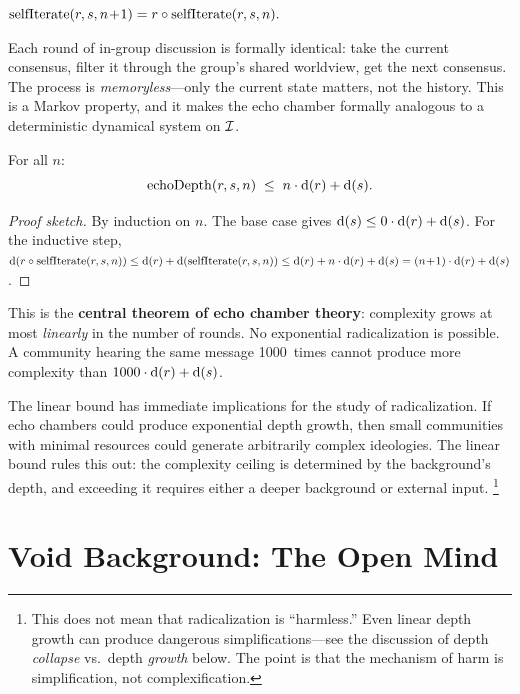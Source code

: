 \begin{theorem}
\label{thm:echo-step}
$\mathrm{selfIterate}(r, s, n\!+\!1) = r\circ\mathrm{selfIterate}(r,s,n).$
\end{theorem}

Each round of in-group discussion is formally identical: take the current
consensus, filter it through the group's shared worldview, get the next
consensus.  The process is \emph{memoryless}---only the current state
matters, not the history.  This is a Markov property, and it makes the echo
chamber formally analogous to a deterministic dynamical system on $\mathcal{I}$.

\begin{theorem}
\label{thm:echo-depth-bound}
For all $n$:
\[
  \mathrm{echoDepth}(r,s,n) \;\le\; n\cdot\operatorname{d}(r) + \operatorname{d}(s).
\]
\end{theorem}

\begin{proof}[Proof sketch]
By induction on $n$.  The base case gives $\operatorname{d}(s)\le 0\cdot\operatorname{d}(r)+\operatorname{d}(s)$.
For the inductive step, $\operatorname{d}(r\circ\mathrm{selfIterate}(r,s,n))
\le\operatorname{d}(r)+\operatorname{d}(\mathrm{selfIterate}(r,s,n))
\le\operatorname{d}(r)+n\cdot\operatorname{d}(r)+\operatorname{d}(s)
= (n\!+\!1)\cdot\operatorname{d}(r)+\operatorname{d}(s)$.
\end{proof}

This is the \textbf{central theorem of echo chamber theory}: complexity
grows at most \emph{linearly} in the number of rounds.  No exponential
radicalization is possible.  A community hearing the same message 1000~times
cannot produce more complexity than $1000\cdot\operatorname{d}(r)+\operatorname{d}(s)$.

The linear bound has immediate implications for the study of radicalization.
If echo chambers could produce exponential depth growth, then small
communities with minimal resources could generate arbitrarily complex
ideologies.  The linear bound rules this out: the complexity ceiling is
determined by the background's depth, and exceeding it requires either a
deeper background or external input.%
\footnote{This does not mean that radicalization is ``harmless.''  Even
linear depth growth can produce dangerous simplifications---see the
discussion of depth \emph{collapse} vs.\ depth \emph{growth} below.  The
point is that the mechanism of harm is simplification, not complexification.}


\section{Void Background: The Open Mind}
\label{sec:echo-void}

